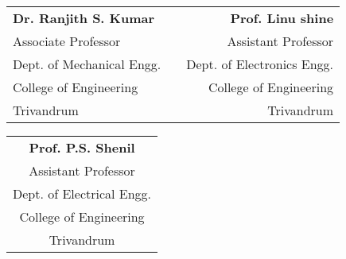 \begin{singlespace}
	\begin{center}
		\begin{tabular}{ p{6cm} p{2cm} r } 
			\textbf{Dr. Ranjith S. Kumar} &&  \textbf{Prof. Linu shine} \\ 
			Associate Professor && Assistant Professor\\ 
			Dept. of Mechanical Engg. && Dept. of Electronics Engg.\\
			College of Engineering && College of Engineering\\
			Trivandrum && Trivandrum\\
		\end{tabular}
	\end{center}
	
	\vspace*{2cm}
	\begin{center}
		\begin{tabular}{c} 
			\textbf{Prof. P.S. Shenil} \\ 
			Assistant Professor\\ 
			Dept. of Electrical Engg.\\
			College of Engineering\\ 
			Trivandrum\\
			
		\end{tabular}
	\end{center}
\end{singlespace}